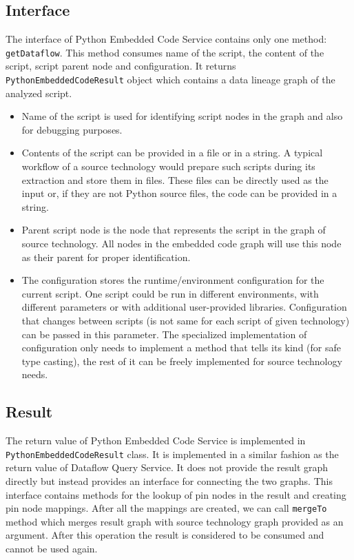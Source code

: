 \subsection{Interface}

The interface of Python Embedded Code Service contains only one method: \texttt{getDataflow}. This method consumes name of the script, the content of the script, script parent node and configuration. It returns \texttt{PythonEmbeddedCodeResult} object which contains a data lineage graph of the analyzed script.
\begin{itemize}
    \item Name of the script is used for identifying script nodes in the graph and also for debugging purposes.
    \item Contents of the script can be provided in a file or in a string. A typical workflow of a source technology would prepare such scripts during its extraction and store them in files. These files can be directly used as the input or, if they are not Python source files, the code can be provided in a string.
    \item Parent script node is the node that represents the script in the graph of source technology. All nodes in the embedded code graph will use this node as their parent for proper identification.
    \item The configuration stores the runtime/environment configuration for the current script. One script could be run in different environments, with different parameters or with additional user-provided libraries. Configuration that changes between scripts (is not same for each script of given technology) can be passed in this parameter. The specialized implementation of configuration only needs to implement a method that tells its kind (for safe type casting), the rest of it can be freely implemented for source technology needs.   
\end{itemize}

\subsection{Result}
The return value of Python Embedded Code Service is implemented in \texttt{PythonEmbeddedCodeResult} class. It is implemented in a similar fashion as the return value of Dataflow Query Service. It does not provide the result graph directly but instead provides an interface for connecting the two graphs. This interface contains methods for the lookup of pin nodes in the result and creating pin node mappings. After all the mappings are created, we can call \texttt{mergeTo} method which merges result graph with source technology graph provided as an argument. After this operation the result is considered to be consumed and cannot be used again.

